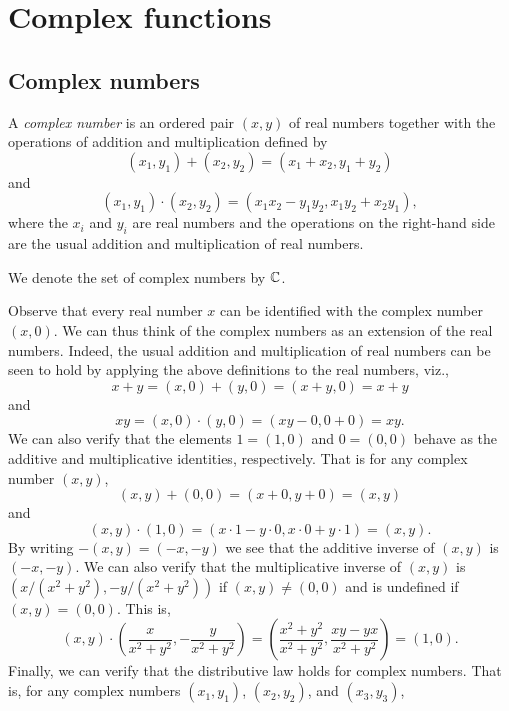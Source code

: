 \chapter{Complex functions}

\section{Complex numbers}

\begin{definition}
    \label{def:complex}
    A \emph{complex number} is an ordered pair \((x, y)\) of real numbers together with the operations of addition and multiplication defined by
    \[
        (x_1, y_1) + (x_2, y_2) = (x_1 + x_2, y_1 + y_2)
    \]
    and
    \[
        (x_1, y_1) \cdot (x_2, y_2) = (x_1x_2 - y_1y_2, x_1y_2 + x_2y_1),
    \]
    where the \(x_i\) and \(y_i\) are real numbers and the operations on the right-hand side are the usual addition and multiplication of real numbers.

    We denote the set of complex numbers by \(\mathbb{C}\).
\end{definition}

Observe that every real number \(x\) can be identified with the complex number \((x, 0)\). We can thus think of the complex numbers as an extension of the real numbers. Indeed, the usual addition and multiplication of real numbers can be seen to hold by applying the above definitions to the real numbers, viz.,
\[
    x + y = (x, 0) + (y, 0) = (x + y, 0) = x + y
\]
and
\[
    xy = (x, 0) \cdot (y, 0) = (xy - 0, 0 + 0) = xy.
\]
We can also verify that the elements \(1 = (1, 0)\) and \(0 = (0, 0)\) behave as the additive and multiplicative identities, respectively. That is for any complex number \((x, y)\),
\[
    (x, y) + (0, 0) = (x + 0, y + 0) = (x, y)
\]
and
\[
    (x, y) \cdot (1, 0) = (x \cdot 1 - y \cdot 0, x \cdot 0 + y \cdot 1) = (x, y).
\]
By writing \(-(x, y) = (-x, -y)\) we see that the additive inverse of \((x, y)\) is \((-x, -y)\). We can also verify that the multiplicative inverse of \((x, y)\) is \((x/(x^2 + y^2), -y/(x^2 + y^2))\) if \((x, y) \neq (0, 0)\) and is undefined if \((x, y) = (0, 0)\). This is,
\[
    (x, y) \cdot \left(\frac{x}{x^2 + y^2}, -\frac{y}{x^2 + y^2}\right) = \left(\frac{x^2 + y^2}{x^2 + y^2}, \frac{xy - yx}{x^2 + y^2}\right) = (1, 0).
\]
Finally, we can verify that the distributive law holds for complex numbers. That is, for any complex numbers \((x_1, y_1)\), \((x_2, y_2)\), and \((x_3, y_3)\),

